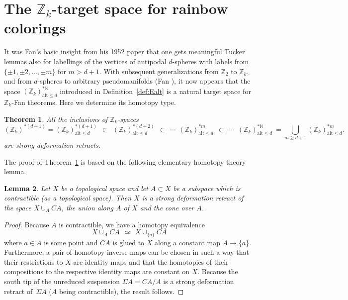 \documentclass[11pt,a4paper,draft]{article}
\newcommand{\Z}{{\mathbb Z}}
\newcommand{\N}{{\mathbb N}}
\newcommand\alt{{\mathrm{alt}}}
\newtheorem{theorem}{Theorem}[section]
\newtheorem{lemma}[theorem]{Lemma}
\theoremstyle{definition}
\begin{document}




\section{The \boldmath$\Z_k$-target space for rainbow colorings}\label{sec:rainbow}

It was Fan's basic insight from his 1952 paper \cite{fan52}
that one gets meaningful Tucker lemmas  also for labellings
of the vertices of antipodal $d$-spheres with labels
from $\{\pm1,\pm2,\ldots,\pm m\}$ for $m>d+1$.
With subsequent generalizations from $\Z_2$ to $\Z_k$, and
from $d$-spheres to arbitrary pseudomanifolds (Fan \cite{fan67}),
it now appears that the space $(\Z_k)^{*\N}_{\alt \le d}$ introduced in
Definition~\ref{def:Ealt} is a natural target space for
$\Z_k$-Fan theorems.  Here we determine its homotopy type.

\begin{theorem} \label{thm:rainbow}
All the inclusions of $\Z_k$-spaces
\[
(\Z_k)^{*(d+1)} =
(\Z_k)^{*(d+1)}_{\alt\le d} \ \ \subset\ \
(\Z_k)^{*(d+2)}_{\alt\le d} \ \ \subset\ \ \cdots \ \
(\Z_k)^{*m}_{\alt\le d} \ \ \subset\ \ \cdots \ \
(\Z_k)^{*\N}_{\alt \le d}\ =\! \bigcup_{m\ge d+1}(\Z_k)_{\alt \leq d}^{*m}.
\]
are strong deformation retracts.
\end{theorem}

The proof of Theorem~\ref{thm:rainbow} is based on the following
elementary homotopy theory lemma.

\begin{lemma} \label{technical} Let $X$ be a topological space and let $A \subset X$ be a subspace which is
contractible (as a topological space).
Then $X$ is a strong deformation retract of the space $X \cup_A CA$,
the union along $A$ of  $X$ and the cone over $A$.
\end{lemma}

\begin{proof} Because $A$ is contractible, we have a homotopy
equivalence
\[
    X \cup_A CA\ \  \simeq\ \  X \cup_{\{a\}} CA
\]
where $a \in A$ is some point and $CA$ is glued to $X$ along
a constant map $A \to \{a\}$. Furthermore, a pair of
homotopy inverse maps can be chosen in such a way that their restrictions to $X$
are identity maps and that the homotopies of their
compositions to the respective identity
maps are constant on $X$. Because the south tip of the unreduced
suspension $\Sigma A = CA / A$ is a strong deformation retract of~$\Sigma A$
($A$ being  contractible), the result follows.
\end{proof}
\end{document}
